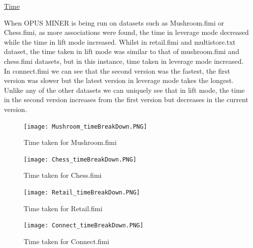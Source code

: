 \documentclass[10pt,a4paper]{article}
\begin{document}
\pagebreak

\underline{Time}
\vspace{0.3cm}
\begin{addmargin}[3em]{1em}
When OPUS MINER is being run on datasets such as Mushroom.fimi or Chess.fimi, as more associations were found, the time in leverage mode decreased while the time in lift mode increased. Whilst in retail.fimi and multistore.txt dataset, the time taken in lift mode was similar to that of mushroom.fimi and chess.fimi datasets, but in this instance, time taken in leverage mode increased. In connect.fimi we can see that the second version was the fastest, the first version was slower but the latest version in leverage mode takes the longest. Unlike any of the other datasets we can uniquely see that in lift mode, the time in the second version increases from the first version but decreases in the current version.
\end{addmargin}

\begin{figure}[h!]
\begin{center}
  \texttt{[image: Mushroom\_timeBreakDown.PNG]}
\end{center}
  \caption{Time taken for Mushroom.fimi}
  \label{fig:SSPresults1}
\end{figure}

\vspace{1cm}

\begin{figure}[h!]
\begin{center}
  \texttt{[image: Chess\_timeBreakDown.PNG]}
\end{center}
  \caption{Time taken for Chess.fimi}
  \label{fig:SSPresults1}
\end{figure}

\vspace{2cm}

\begin{figure}[h!]
\begin{center}
  \texttt{[image: Retail\_timeBreakDown.PNG]}
\end{center}
  \caption{Time taken for Retail.fimi}
  \label{fig:SSPresults1}
\end{figure}

\vspace{2cm}

\begin{figure}[h!]
\begin{center}
  \texttt{[image: Connect\_timeBreakDown.PNG]}
\end{center}
  \caption{Time taken for Connect.fimi}
  \label{fig:SSPresults1}
\end{figure}
\end{document}
